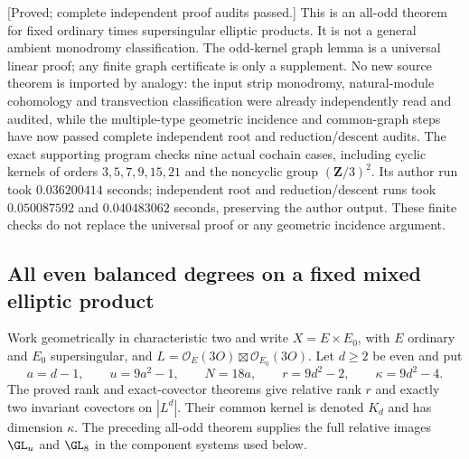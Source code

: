 \begin{remark}
\label{rem:mixed-all-odd-norm-scope-candidate}
\textup{[Proved; complete independent proof audits passed.]}
This is an all-odd theorem for fixed ordinary times
supersingular elliptic products. It is not a general ambient
monodromy classification. The odd-kernel graph lemma is a
universal linear proof; any finite graph certificate is only
a supplement. No new source theorem is imported by analogy:
the input strip monodromy, natural-module cohomology and
transvection classification were already independently read
and audited, while the multiple-type geometric incidence and
common-graph steps have now passed complete independent root and
reduction/descent audits. The exact supporting program
checks nine actual cochain cases, including cyclic kernels of orders
$3,5,7,9,15,21$ and the noncyclic group $(\mathbf Z/3)^2$.
Its author run took $0.036200414$ seconds; independent root and
reduction/descent runs took $0.050087592$ and $0.040483062$
seconds, preserving the author output. These finite checks do not
replace the universal proof or any geometric incidence argument.
\end{remark}


\subsection{All even balanced degrees on a fixed mixed elliptic product}
\label{subsec:mixed-all-even-wreath-candidate}

Work geometrically in characteristic two and write
$X=E\times E_0$, with $E$ ordinary and $E_0$ supersingular, and
$L=\mathcal O_E(3O)\boxtimes\mathcal O_{E_0}(3O)$.
Let $d\geq2$ be even and put
\[
 a=d-1,\qquad u=9a^2-1,\qquad N=18a,\qquad
 r=9d^2-2,\qquad \kappa=9d^2-4.
\]
The proved rank and exact-covector theorems give relative rank $r$
and exactly two invariant covectors on $|L^d|$. Their common
kernel is denoted $K_d$ and has dimension $\kappa$.
The preceding all-odd theorem supplies the full relative images
$\GL_u$ and $\GL_8$ in the component systems used below.

